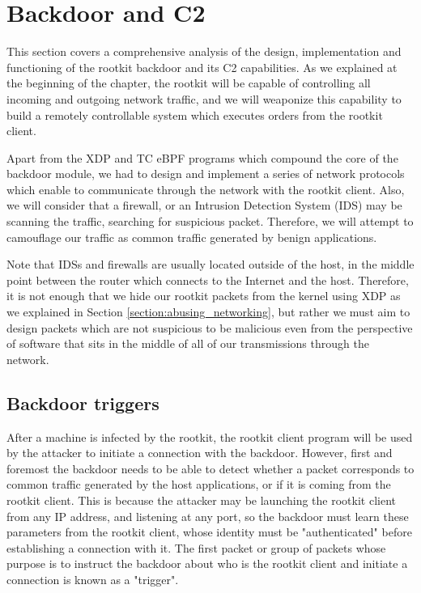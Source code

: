 \section{Backdoor and C2} \label{section:c2}
This section covers a comprehensive analysis of the design, implementation and functioning of the rootkit backdoor and its C2 capabilities. As we explained at the beginning of the chapter, the rootkit will be capable of controlling all incoming and outgoing network traffic, and we will weaponize this capability to build a remotely controllable system which executes orders from the rootkit client.

Apart from the XDP and TC eBPF programs which compound the core of the backdoor module, we had to design and implement a series of network protocols which enable to communicate through the network with the rootkit client. Also, we will consider that a firewall, or an Intrusion Detection System (IDS) \cite{ips} may be scanning the traffic, searching for suspicious packet. Therefore, we will attempt to camouflage our traffic as common traffic generated by benign applications. 

Note that IDSs and firewalls are usually located outside of the host, in the middle point between the router which connects to the Internet and the host. Therefore, it is not enough that we hide our rootkit packets from the kernel using XDP as we explained in Section \ref{section:abusing_networking}, but rather we must aim to design packets which are not suspicious to be malicious even from the perspective of software that sits in the middle of all of our transmissions through the network.

\subsection{Backdoor triggers} \label{subsection:triggers}
After a machine is infected by the rootkit, the rootkit client program will be used by the attacker to initiate a connection with the backdoor. However, first and foremost the backdoor needs to be able to detect whether a packet corresponds to common traffic generated by the host applications, or if it is coming from the rootkit client. This is because the attacker may be launching the rootkit client from any IP address, and listening at any port, so the backdoor must learn these parameters from the rootkit client, whose identity must be "authenticated" before establishing a connection with it. The first packet or group of packets whose purpose is to instruct the backdoor about who is the rootkit client and initiate a connection is known as a "trigger".

